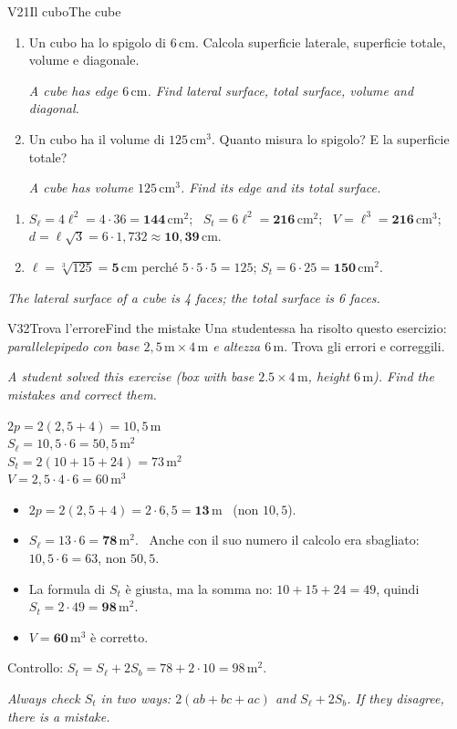\documentclass[11pt,a4paper]{article}
\newcommand{\en}[1]{\par{\small\itshape\color{engray}#1\par}}
\newcommand{\unit}[1]{\,\mathrm{#1}}
\newcommand{\cm}{\unit{cm}}
\newcommand{\cmq}{\unit{cm^2}}
\newcommand{\cmc}{\unit{cm^3}}
\newcommand{\mq}{\unit{m^2}}
\begin{document}
\begin{esercizio}{V2}{1}{Il cubo}{The cube}
\begin{enumerate}
\item Un cubo ha lo spigolo di $6\cm$. Calcola superficie laterale, superficie totale, volume e diagonale.
\en{A cube has edge $6\cm$. Find lateral surface, total surface, volume and diagonal.}
\item Un cubo ha il volume di $125\cmc$. Quanto misura lo spigolo? E la superficie totale?
\en{A cube has volume $125\cmc$. Find its edge and its total surface.}
\end{enumerate}
\end{esercizio}
\begin{solbox}
\begin{enumerate}
\item $S_\ell=4\ell^2=4\cdot36=\mathbf{144\cmq}$; \ $S_t=6\ell^2=\mathbf{216\cmq}$; \ $V=\ell^3=\mathbf{216\cmc}$; \ $d=\ell\sqrt3=6\cdot1,732\approx\mathbf{10,39\cm}$.
\item $\ell=\sqrt[3]{125}=\mathbf{5\cm}$ perché $5\cdot5\cdot5=125$; \quad $S_t=6\cdot25=\mathbf{150\cmq}$.
\end{enumerate}
\en{The lateral surface of a cube is 4 faces; the total surface is 6 faces.}
\end{solbox}

\begin{esercizio}{V3}{2}{Trova l'errore}{Find the mistake}
Una studentessa ha risolto questo esercizio: \emph{parallelepipedo con base $2,5\unit{m}\times4\unit{m}$ e altezza $6\unit{m}$}. Trova gli errori e correggili.
\en{A student solved this exercise (box with base $2.5 \times 4\unit{m}$, height $6\unit{m}$). Find the mistakes and correct them.}
\begin{center}
\begin{tcolorbox}[width=0.62\linewidth, colback=white, colframe=black!30, boxrule=0.4pt, arc=1pt, left=8pt]
\small
$2p=2(2,5+4)=10,5\unit{m}$\\
$S_\ell=10,5\cdot6=50,5\mq$\\
$S_t=2(10+15+24)=73\mq$\\
$V=2,5\cdot4\cdot6=60\unit{m^3}$
\end{tcolorbox}
\end{center}
\end{esercizio}
\begin{solbox}
\begin{itemize}
\item $2p=2(2,5+4)=2\cdot6,5=\mathbf{13\unit{m}}$ \ (non $10,5$).
\item $S_\ell=13\cdot6=\mathbf{78\mq}$. \ Anche con il suo numero il calcolo era sbagliato: $10,5\cdot6=63$, non $50,5$.
\item La formula di $S_t$ è giusta, ma la somma no: $10+15+24=49$, quindi $S_t=2\cdot49=\mathbf{98\mq}$.
\item $V=\mathbf{60\unit{m^3}}$ è corretto.
\end{itemize}
Controllo: $S_t=S_\ell+2S_b=78+2\cdot10=98\mq$. \checkmark
\en{Always check $S_t$ in two ways: $2(ab+bc+ac)$ and $S_\ell + 2S_b$. If they disagree, there is a mistake.}
\end{solbox}
\end{document}
